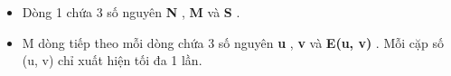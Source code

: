 \begin{itemize}
	\item Dòng 1 chứa 3 số nguyên \textbf{ N } , \textbf{ M } và \textbf{ S } .
	\item M dòng tiếp theo mỗi dòng chứa 3 số nguyên \textbf{ u } , \textbf{ v } và \textbf{ E(u, v) } . Mỗi cặp số (u, v) chỉ xuất hiện tối đa 1 lần.
\end{itemize}